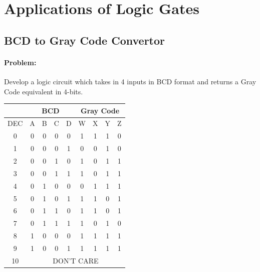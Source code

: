 \documentclass[12pt, a4paper]{report}
\begin{document}
	\section{Applications of Logic Gates}
	\subsection{BCD to Gray Code Convertor}
	\paragraph{Problem:}
	Develop a logic circuit which takes in 4 inputs in BCD format and returns a Gray Code equivalent in 4-bits.
	\begin{center}
		\begin{tabular}{c|c|c|c|c||c|c|c|c}
			& \multicolumn{4}{c|}{BCD} & \multicolumn{4}{c|}{Gray Code} \\ \hline
			DEC & A & B & C & D & W & X & Y & Z \\ \hline
			0   & 0 & 0 & 0 & 0 & 1 & 1 & 1 & 0 \\ \hline
			1   & 0 & 0 & 0 & 1 & 0 & 0 & 1 & 0 \\ \hline
			2   & 0 & 0 & 1 & 0 & 1 & 0 & 1 & 1 \\ \hline
			3   & 0 & 0 & 1 & 1 & 1 & 0 & 1 & 1 \\ \hline
			4   & 0 & 1 & 0 & 0 & 0 & 1 & 1 & 1 \\ \hline
			5   & 0 & 1 & 0 & 1 & 1 & 1 & 0 & 1 \\ \hline
			6   & 0 & 1 & 1 & 0 & 1 & 1 & 0 & 1 \\ \hline
			7   & 0 & 1 & 1 & 1 & 1 & 0 & 1 & 0 \\ \hline
			8   & 1 & 0 & 0 & 0 & 1 & 1 & 1 & 1 \\ \hline
			9   & 1 & 0 & 0 & 1 & 1 & 1 & 1 & 1 \\ \hline
			10  & \multicolumn{8}{c|}{DON'T CARE}                           \\ 
		\end{tabular}
	\end{center}
\end{document}
